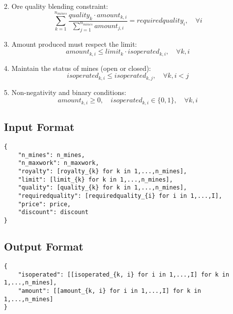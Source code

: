 \documentclass{article}
\begin{document}
2. Ore quality blending constraint:
\[
\sum_{k=1}^{n_{mines}} \frac{quality_k \cdot amount_{k,i}}{\sum_{j=1}^{n_{mines}} amount_{j,i}} = requiredquality_i, \quad \forall i
\]

3. Amount produced must respect the limit:
\[
amount_{k,i} \leq limit_k \cdot isoperated_{k,i}, \quad \forall k, i
\]

4. Maintain the status of mines (open or closed):
\[
isoperated_{k,i} \leq isoperated_{k,j}, \quad \forall k, i < j
\]

5. Non-negativity and binary conditions:
\[
amount_{k,i} \geq 0, \quad isoperated_{k,i} \in \{0, 1\}, \quad \forall k, i
\]

\subsection*{Input Format}
\begin{verbatim}
{
    "n_mines": n_mines,
    "n_maxwork": n_maxwork,
    "royalty": [royalty_{k} for k in 1,...,n_mines],
    "limit": [limit_{k} for k in 1,...,n_mines],
    "quality": [quality_{k} for k in 1,...,n_mines],
    "requiredquality": [requiredquality_{i} for i in 1,...,I],
    "price": price,
    "discount": discount
}
\end{verbatim}

\subsection*{Output Format}
\begin{verbatim}
{
    "isoperated": [[isoperated_{k, i} for i in 1,...,I] for k in 1,...,n_mines],
    "amount": [[amount_{k, i} for i in 1,...,I] for k in 1,...,n_mines]
}
\end{verbatim}
\end{document}
